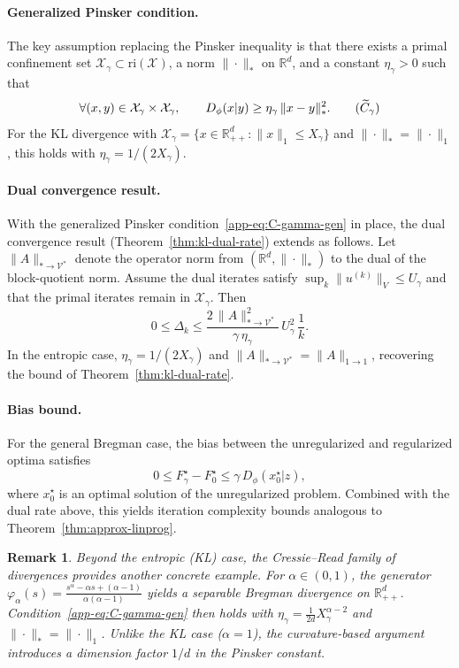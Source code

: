 \documentclass{article}
\theoremstyle{plain}
\newtheorem{remark}{Remark}[section]
\newcommand{\RR}{\mathbb{R}}
\newcommand{\Umax}{U_\gamma}
\newcommand{\Xmax}{X_\gamma}
\newcommand{\Xx}{\mathcal{X}}
\begin{document}
\paragraph{Generalized Pinsker condition.}
The key assumption replacing the Pinsker inequality is that there exists a primal confinement set $\Xx_\gamma\subset \mathrm{ri}(\Xx)$, a norm $\|\cdot\|_\ast$ on $\RR^d$, and a constant $\eta_\gamma>0$ such that
\begin{equation}\label{app-eq:C-gamma-gen}
\forall (x,y)\in \Xx_\gamma\times \Xx_\gamma,\qquad
D_\phi(x|y) \ge \eta_\gamma\,\|x-y\|_\ast^2.
\tag{$\widetilde{C}_\gamma$}
\end{equation}
For the KL divergence with $\Xx_\gamma=\{x\in\RR^d_{++}: \|x\|_1\le \Xmax\}$ and $\|\cdot\|_\ast=\|\cdot\|_1$, this holds with $\eta_\gamma=1/(2\Xmax)$.

\paragraph{Dual convergence result.}
With the generalized Pinsker condition~\eqref{app-eq:C-gamma-gen} in place, the dual convergence result (Theorem~\ref{thm:kl-dual-rate}) extends as follows.
Let $\|A\|_{\ast\to \mathcal{V}^\ast}$ denote the operator norm from $(\RR^d, \|\cdot\|_\ast)$ to the dual of the block-quotient norm.
Assume the dual iterates satisfy $\sup_k \|u^{(k)}\|_V \le \Umax$ and that the primal iterates remain in $\Xx_\gamma$.
Then
\[
  0 \le \Delta_k
  \le
  \frac{2\,\|A\|_{\ast\to \mathcal{V}^\ast}^{2}}{\gamma\,\eta_\gamma}\,
  \Umax^{2}\,
  \frac{1}{k}.
\]
In the entropic case, $\eta_\gamma = 1/(2\Xmax)$ and $\|A\|_{\ast\to \mathcal{V}^\ast} = \|A\|_{1\to1}$, recovering the bound of Theorem~\ref{thm:kl-dual-rate}.

\paragraph{Bias bound.}
For the general Bregman case, the bias between the unregularized and regularized optima satisfies
\[
  0 \le F_\gamma^\star - F_0^\star \le \gamma\,D_\phi(x_0^\star|z),
\]
where $x_0^\star$ is an optimal solution of the unregularized problem.
Combined with the dual rate above, this yields iteration complexity bounds analogous to Theorem~\ref{thm:approx-linprog}.

\begin{remark}
Beyond the entropic (KL) case, the Cressie--Read family of divergences provides another concrete example.
For $\alpha\in(0,1)$, the generator $\varphi_\alpha(s) = \frac{s^\alpha - \alpha s + (\alpha-1)}{\alpha(\alpha-1)}$ yields a separable Bregman divergence on $\RR^d_{++}$.
Condition~\eqref{app-eq:C-gamma-gen} then holds with $\eta_\gamma = \frac{1}{2d}\Xmax^{\alpha-2}$ and $\|\cdot\|_\ast = \|\cdot\|_1$.
Unlike the KL case ($\alpha=1$), the curvature-based argument introduces a dimension factor $1/d$ in the Pinsker constant.
\end{remark}
\end{document}
